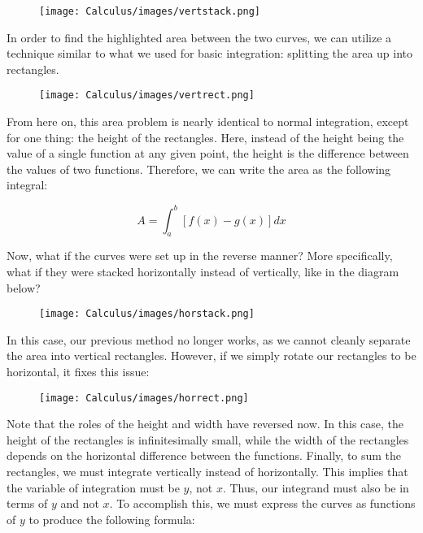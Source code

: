 \documentclass[11pt]{article}
\begin{document}
\begin{figure}[h]
    \centering
    \hspace*{0.7cm}   
    \texttt{[image: Calculus/images/vertstack.png]}
\end{figure}

In order to find the highlighted area between the two curves, we can utilize a technique similar to what we used for basic integration: splitting the area up into rectangles.

\begin{figure}[h]
    \centering
    \hspace*{2cm}    
    \texttt{[image: Calculus/images/vertrect.png]}
\end{figure}

From here on, this area problem is nearly identical to normal integration, except for one thing: the height of the rectangles. Here, instead of the height being the value of a single function at any given point, the height is the difference between the values of two functions. Therefore, we can write the area as the following integral:

\[ A = \int_{a}^{b}[f(x)-g(x)]dx \]

Now, what if the curves were set up in the reverse manner? More specifically, what if they were stacked horizontally instead of vertically, like in the diagram below?

\begin{figure}[h]
    \centering
    \texttt{[image: Calculus/images/horstack.png]}
\end{figure}

In this case, our previous method no longer works, as we cannot cleanly separate the area into vertical rectangles. However, if we simply rotate our rectangles to be horizontal, it fixes this issue:

\begin{figure}[h]
    \centering
    \texttt{[image: Calculus/images/horrect.png]}
\end{figure}

Note that the roles of the height and width have reversed now. In this case, the height of the rectangles is infinitesimally small, while the width of the rectangles depends on the horizontal difference between the functions. Finally, to sum the rectangles, we must integrate vertically instead of horizontally. This implies that the variable of integration must be $y$, not $x$. Thus, our integrand must also be in terms of $y$ and not $x$. To accomplish this, we must express the curves as functions of $y$ to produce the following formula:
\end{document}
